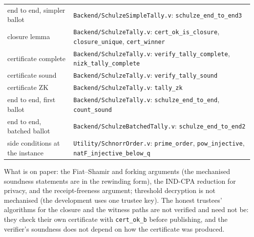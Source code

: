 \documentclass[11pt,a4paper]{article}
\newcommand{\rocq}[1]{\texttt{#1}}
\theoremstyle{remark}
\begin{document}
\begin{center}
\begin{tabularx}{\textwidth}{@{}l>{\raggedright\arraybackslash}X@{}}
  end to end, simpler ballot & \rocq{Backend/SchulzeSimpleTally.v}: \rocq{schulze\_end\_to\_end3} \\
  closure lemma & \rocq{Backend/SchulzeTally.v}: \rocq{cert\_ok\_is\_closure}, \rocq{closure\_unique}, \rocq{cert\_winner} \\
  certificate complete & \rocq{Backend/SchulzeTally.v}: \rocq{verify\_tally\_complete}, \rocq{nizk\_tally\_complete} \\
  certificate sound & \rocq{Backend/SchulzeTally.v}: \rocq{verify\_tally\_sound} \\
  certificate ZK & \rocq{Backend/SchulzeTally.v}: \rocq{tally\_zk} \\
  end to end, first ballot & \rocq{Backend/SchulzeTally.v}: \rocq{schulze\_end\_to\_end}, \rocq{count\_sound} \\
  end to end, batched ballot & \rocq{Backend/SchulzeBatchedTally.v}: \rocq{schulze\_end\_to\_end2} \\
  side conditions at the instance & \rocq{Utility/SchnorrOrder.v}: \rocq{prime\_order}, \rocq{pow\_injective}, \rocq{natF\_injective\_below\_q} \\
  \bottomrule
\end{tabularx}
\end{center}
What is on paper: the Fiat--Shamir and forking arguments (the mechanised
soundness statements are in the rewinding form), the IND-CPA reduction for
privacy, and the receipt-freeness argument; threshold decryption is not
mechanised (the development uses one trustee key). The honest trustees'
algorithms for the closure and the witness paths are not verified and need
not be: they check their own certificate with \rocq{cert\_ok\_b} before
publishing, and the verifier's soundness does not depend on how the
certificate was produced.
\end{document}

